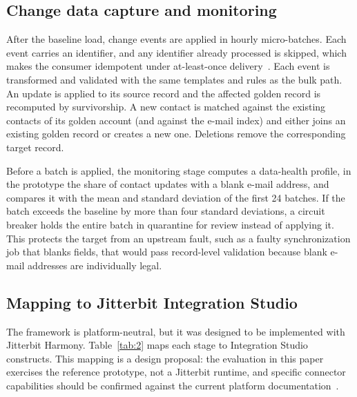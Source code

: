 \subsection{Change data capture and monitoring}\label{sec:3.7}

After the baseline load, change events are applied in hourly micro-batches. Each event carries an identifier, and any identifier already processed is skipped, which makes the consumer idempotent under at-least-once delivery~\cite{kleppmann2017}. Each event is transformed and validated with the same templates and rules as the bulk path. An update is applied to its source record and the affected golden record is recomputed by survivorship. A new contact is matched against the existing contacts of its golden account (and against the e-mail index) and either joins an existing golden record or creates a new one. Deletions remove the corresponding target record.

Before a batch is applied, the monitoring stage computes a data-health profile, in the prototype the share of contact updates with a blank e-mail address, and compares it with the mean and standard deviation of the first 24 batches. If the batch exceeds the baseline by more than four standard deviations, a circuit breaker holds the entire batch in quarantine for review instead of applying it. This protects the target from an upstream fault, such as a faulty synchronization job that blanks fields, that would pass record-level validation because blank e-mail addresses are individually legal.

\subsection{Mapping to Jitterbit Integration Studio}\label{sec:3.8}

The framework is platform-neutral, but it was designed to be implemented with Jitterbit Harmony. Table~\ref{tab:2} maps each stage to Integration Studio constructs. This mapping is a design proposal: the evaluation in this paper exercises the reference prototype, not a Jitterbit runtime, and specific connector capabilities should be confirmed against the current platform documentation~\cite{jitterbit2026}.

